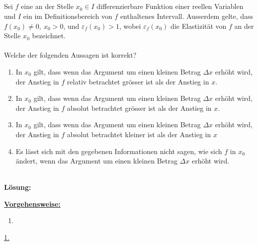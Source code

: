 \subsection*{}
Sei $f$ eine an der Stelle $x_0 \in I$ differenzierbare Funktion einer reellen Variablen und $I$ ein im Definitionsbereich von $f$ enthaltenes Intervall.
Ausserdem gelte, dass $f(x_0)  \neq 0, \ x_0 > 0$, und $\varepsilon_f(x_0) > 1$, wobei $\varepsilon_f(x_0)$ die Elastizität von $f$ an der Stelle $x_0$ bezeichnet.\\
\\
Welche der folgenden Aussagen ist korrekt?
\renewcommand{\labelenumi}{(\alph{enumi})}
\begin{enumerate}
	\item 
	In $x_0$ gilt, dass wenn das Argument um einen kleinen Betrag $\Delta x$ erhöht wird, der Anstieg in $f$ relativ betrachtet grösser ist als der Anstieg in $x$.
	\item
	In $x_0$ gilt, dass wenn das Argument um einen kleinen Betrag $\Delta x$ erhöht wird, der Anstieg in $f$ absolut betrachtet grösser ist als der Anstieg in $x$.
	\item
	In $x_0$ gilt, dass wenn das Argument um einen kleinen Betrag $\Delta x$ erhöht wird, der Anstieg in $f$ absolut betrachtet kleiner ist als der Anstieg in $x$
	\item
	Es lässt sich mit den gegebenen Informationen nicht sagen, wie sich $f$ in $x_0$ ändert, wenn das Argument um einen kleinen Betrag $\Delta x$ erhöht wird.
\end{enumerate}
\ \\
\textbf{Lösung:}
\begin{mdframed}
	\underline{\textbf{Vorgehensweise:}}
	\renewcommand{\labelenumi}{\theenumi.}
	\begin{enumerate}
		\item 
	\end{enumerate}
\end{mdframed}

\underline{1. }\\



\newpage
